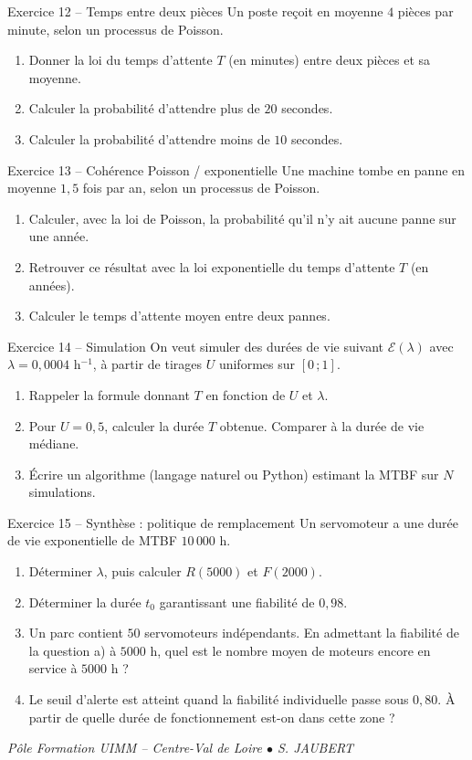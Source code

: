 \documentclass[a4paper,11pt]{article}
\begin{document}
\begin{exo}{Exercice 12 -- Temps entre deux pièces}
Un poste reçoit en moyenne $4$ pièces par minute, selon un processus de Poisson.
\begin{enumerate}[label=\alph*)]
  \item Donner la loi du temps d'attente $T$ (en minutes) entre deux pièces et sa moyenne.
  \item Calculer la probabilité d'attendre plus de $20$ secondes.
  \item Calculer la probabilité d'attendre moins de $10$ secondes.
\end{enumerate}
\end{exo}

\begin{exo}{Exercice 13 -- Cohérence Poisson / exponentielle}
Une machine tombe en panne en moyenne $1{,}5$ fois par an, selon un processus de Poisson.
\begin{enumerate}[label=\alph*)]
  \item Calculer, avec la loi de Poisson, la probabilité qu'il n'y ait aucune panne sur une année.
  \item Retrouver ce résultat avec la loi exponentielle du temps d'attente $T$ (en années).
  \item Calculer le temps d'attente moyen entre deux pannes.
\end{enumerate}
\end{exo}

\begin{exo}{Exercice 14 -- Simulation}
On veut simuler des durées de vie suivant $\mathcal{E}(\lambda)$ avec $\lambda = 0{,}0004$ h$^{-1}$, à partir de tirages $U$ uniformes sur $[0\,;1]$.
\begin{enumerate}[label=\alph*)]
  \item Rappeler la formule donnant $T$ en fonction de $U$ et $\lambda$.
  \item Pour $U = 0{,}5$, calculer la durée $T$ obtenue. Comparer à la durée de vie médiane.
  \item Écrire un algorithme (langage naturel ou Python) estimant la MTBF sur $N$ simulations.
\end{enumerate}
\end{exo}

\begin{exo}{Exercice 15 -- Synthèse : politique de remplacement}
Un servomoteur a une durée de vie exponentielle de MTBF $10\,000$ h.
\begin{enumerate}[label=\alph*)]
  \item Déterminer $\lambda$, puis calculer $R(5000)$ et $F(2000)$.
  \item Déterminer la durée $t_0$ garantissant une fiabilité de $0{,}98$.
  \item Un parc contient $50$ servomoteurs indépendants. En admettant la fiabilité de la question a) à $5000$ h, quel est le nombre moyen de moteurs encore en service à $5000$ h ?
  \item Le seuil d'alerte est atteint quand la fiabilité individuelle passe sous $0{,}80$. À partir de quelle durée de fonctionnement est-on dans cette zone ?
\end{enumerate}
\end{exo}

\vfill
\begin{center}\color{uimmgray}\small
\textit{Pôle Formation UIMM -- Centre-Val de Loire $\bullet$ S. JAUBERT}
\end{center}
\end{document}
